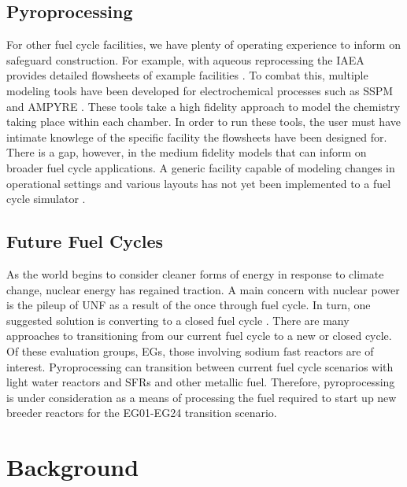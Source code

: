 \subsection{Pyroprocessing}
For other fuel cycle facilities, we have plenty of operating experience to inform on safeguard construction. For example, with aqueous reprocessing
the IAEA provides detailed flowsheets of example facilities \cite{international_atomic_energy_agency_implications_2004}. To combat this, multiple modeling
tools have been developed for electrochemical processes such as SSPM and AMPYRE \cite{}. These tools take a high fidelity approach to model the
chemistry taking place within each chamber. In order to run these tools, the user must have intimate knowlege of the specific facility the flowsheets have
been designed for. There is a gap, however, in the medium fidelity models that can inform on broader fuel cycle applications. A generic facility
capable of modeling changes in operational settings and various layouts has not yet been implemented to a fuel cycle simulator \cite{borrelli_approaches_2017}.


\subsection{Future Fuel Cycles}
As the world begins to consider cleaner forms of energy in response to climate change, nuclear energy has regained traction. A main
concern with nuclear power is the pileup of UNF as a result of the once through fuel cycle. In turn, one suggested solution is converting to a closed fuel cycle \cite{wigeland_nuclear_2014}. There are many approaches to transitioning from our current
fuel cycle to a new or closed cycle. Of these evaluation groups, EGs, those involving sodium fast reactors are of interest. 
Pyroprocessing can transition between current fuel cycle scenarios with light water reactors and SFRs and other metallic fuel.
Therefore, pyroprocessing is under consideration as a means of processing the fuel required to start up new breeder reactors for
the EG01-EG24 transition scenario.


\section{Background}
